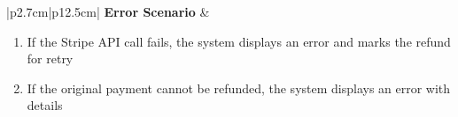 \begin{table}[H]
\begin{tabular}{|p{2.7cm}|p{12.5cm}|}
        \hline
        \textbf{Error Scenario} & \begin{minipage}[t]{\linewidth}
                                      \begin{enumerate}[topsep=0pt,itemsep=1pt,parsep=0pt,partopsep=0pt]
                                          \item If the Stripe API call fails, the system displays an error and marks the refund
                                                for retry
                                          \item If the original payment cannot be refunded, the system displays an error with
                                                details
                                      \end{enumerate}
                                  \end{minipage}               \\
        \hline
    \end{tabular}
    \label{tab:admin-execute-stripe-refund}
\end{table}








